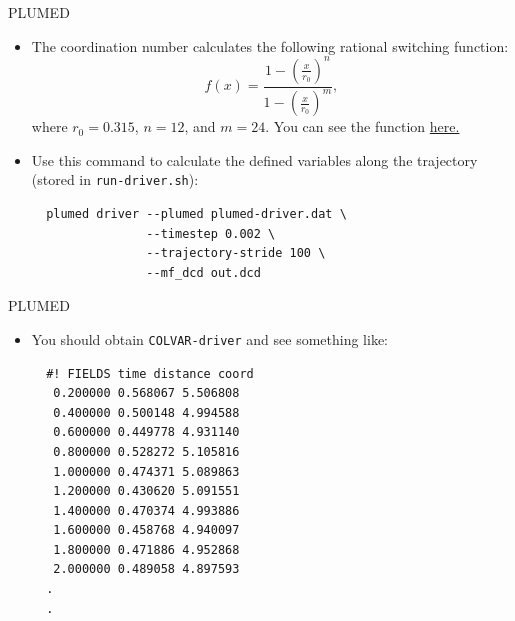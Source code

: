 \documentclass[10pt]{beamer}
\begin{document}
\begin{frame}[fragile]{PLUMED}
  \begin{itemize}
    \setlength\itemsep{1em}
    \item The coordination number calculates the following rational switching function:
    \begin{equation}
      f(x)=\frac{1 - \left( \frac{x}{r_0} \right)^n}{1 - \left( \frac{x}{r_0} \right)^m},
    \end{equation}
    where $r_0=0.315$, $n=12$, and $m=24$. You can see the function \href{https://www.desmos.com/calculator/nqujdsvj0z}{here.}

    \item Use this command to calculate the defined variables along the trajectory (stored in \texttt{run-driver.sh}):
    \begin{lstlisting}
  plumed driver --plumed plumed-driver.dat \
                --timestep 0.002 \
                --trajectory-stride 100 \
                --mf_dcd out.dcd
    \end{lstlisting}
  \end{itemize}
\end{frame}

\begin{frame}[fragile]{PLUMED}
  \begin{itemize}
    \setlength\itemsep{1em}
    \item You should obtain \texttt{COLVAR-driver} and see something like:
    \begin{lstlisting}
  #! FIELDS time distance coord
   0.200000 0.568067 5.506808
   0.400000 0.500148 4.994588
   0.600000 0.449778 4.931140
   0.800000 0.528272 5.105816
   1.000000 0.474371 5.089863
   1.200000 0.430620 5.091551
   1.400000 0.470374 4.993886
   1.600000 0.458768 4.940097
   1.800000 0.471886 4.952868
   2.000000 0.489058 4.897593
  .
  .
    \end{lstlisting}
  \end{itemize}
\end{frame}
\end{document}
